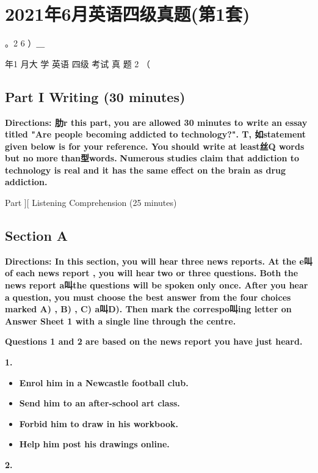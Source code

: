 \documentclass[UTF8,11pt]{ctexart}
\begin{document}
\section*{2021年6月英语四级真题(第1套)}
。2 6 ）＿


年1 月大 学 英语 四级 考试 真 题 2 （


\subsection*{Part I Writing (30 minutes)}


\textbf{Directions: 肋r this part, you are allowed 30 minutes to write an essay titled "Are people becoming addicted} \textbf{to technology?". T, 如statement given below is for your reference. You should write at least丝Q words but no} \textbf{more than型words.} \textbf{Numerous studies claim that addiction to technology is real and it has the same effect on the brain as drug} \textbf{addiction.}


Part ][ Listening Comprehension (25 minutes)


\subsection*{Section A}


\textbf{Directions: In this section, you will hear three news reports. At the e叫of each news report , you will hear} \textbf{two or three questions. Both the news report a叫the questions will be spoken only once. After you hear a} \textbf{question, you must choose the best answer from the four choices marked A) , B) , C) a叫D). Then mark} \textbf{the correspo叫ing letter on Answer Sheet 1 with a single line through the centre.}


\textbf{Questions 1 and 2 are based on the news report you have just heard.}


\textbf{1.}


\begin{itemize}[leftmargin=2em,itemsep=.2em,topsep=.4em]\item[A.] \textbf{Enrol him in a Newcastle football club.}
\item[B.] \textbf{Send him to an after-school art class.}
\item[C.] \textbf{Forbid him to draw in his workbook.}
\item[D.] \textbf{Help him post his drawings online.}
\end{itemize}

\textbf{2.}
\end{document}
